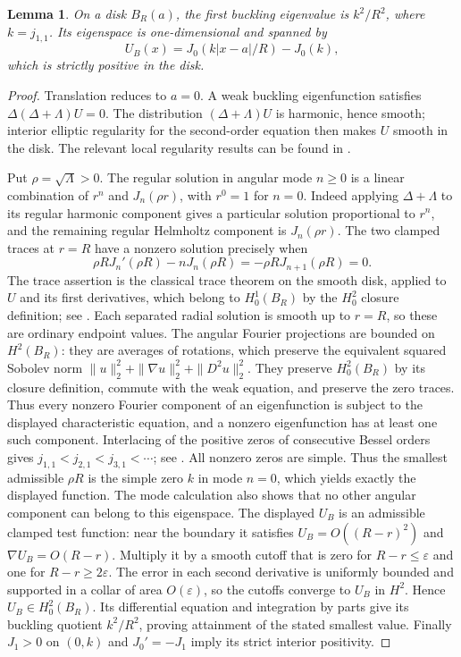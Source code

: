 \documentclass[11pt]{article}
\newtheorem{lemma}[theorem]{Lemma}
\theoremstyle{remark}
\begin{document}
\begin{lemma}\label{app:disk}
On a disk $B_R(a)$, the first buckling eigenvalue is $k^2/R^2$,
where $k=j_{1,1}$. Its eigenspace is one-dimensional and spanned by
\[
 U_B(x)=J_0(k|x-a|/R)-J_0(k),
\]
which is strictly positive in the disk.
\end{lemma}
\begin{proof}
Translation reduces to $a=0$. A weak buckling eigenfunction satisfies
$\Delta(\Delta+\Lambda)U=0$. The distribution
$(\Delta+\Lambda)U$ is harmonic, hence smooth; interior elliptic
regularity for the second-order equation then makes $U$ smooth
in the disk. The relevant local regularity results can be found in
\cite[Sections~2.2 and~6.3]{EvansPDE}.

Put $\rho=\sqrt\Lambda>0$. The regular solution in angular mode
$n\ge0$ is a linear combination of $r^n$ and $J_n(\rho r)$,
with $r^0=1$ for $n=0$. Indeed applying $\Delta+\Lambda$ to its
regular harmonic component gives a particular solution proportional
to $r^n$, and the remaining regular Helmholtz component is
$J_n(\rho r)$. The two clamped traces at $r=R$ have a nonzero
solution precisely when
\[
 \rho R J_n'(\rho R)-nJ_n(\rho R)
             =-\rho R J_{n+1}(\rho R)=0.
\]
The trace assertion is the classical trace theorem on the smooth
disk, applied to $U$ and its first derivatives, which belong to
$H_0^1(B_R)$ by the $H_0^2$ closure definition; see
\cite[Section~4.3]{EG}. Each separated radial solution is
smooth up to $r=R$, so these are ordinary endpoint values.
The angular Fourier projections are bounded on $H^2(B_R)$: they
are averages of rotations, which preserve the equivalent squared
Sobolev norm $\|u\|_2^2+\|\nabla u\|_2^2+\|D^2u\|_2^2$.
They preserve $H_0^2(B_R)$ by its closure definition, commute with
the weak equation, and preserve the zero traces. Thus every
nonzero Fourier component of an eigenfunction is subject to the
displayed characteristic equation, and a nonzero eigenfunction
has at least one such component.
Interlacing of the positive zeros of consecutive Bessel orders gives
$j_{1,1}<j_{2,1}<j_{3,1}<\cdots$; see
\cite[Section~10.21(i)]{DLMF}. All nonzero zeros are simple.
Thus the smallest admissible $\rho R$ is the simple zero $k$ in
mode $n=0$, which yields exactly the displayed function.
The mode calculation also shows that no other angular component
can belong to this eigenspace. The displayed $U_B$ is an admissible
clamped test function: near the boundary it satisfies
$U_B=O((R-r)^2)$ and $\nabla U_B=O(R-r)$. Multiply it by a smooth
cutoff that is zero for $R-r\le\varepsilon$ and one for
$R-r\ge2\varepsilon$. The error in each second derivative is
uniformly bounded and supported in a collar of area $O(\varepsilon)$,
so the cutoffs converge to $U_B$ in $H^2$. Hence $U_B\in H_0^2(B_R)$.
Its differential equation and integration by parts give its
buckling quotient $k^2/R^2$, proving attainment of the stated
smallest value. Finally $J_1>0$ on $(0,k)$ and
$J_0'=-J_1$ imply its strict interior positivity.
\end{proof}
\end{document}

